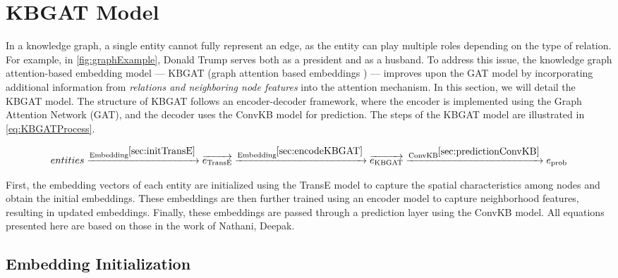 \section{KBGAT Model}

In a knowledge graph, a single entity cannot fully represent an edge, as the entity can play multiple roles depending on the type of relation. For example, in \autoref{fig:graphExample}, Donald Trump serves both as a president and as a husband. To address this issue, the knowledge graph attention-based embedding model — KBGAT (graph attention based embeddings \cite{nathani2019learning}) — improves upon the GAT model by incorporating additional information from \textit{relations and neighboring node features} into the attention mechanism. In this section, we will detail the KBGAT model. The structure of KBGAT follows an encoder-decoder framework, where the encoder is implemented using the Graph Attention Network (GAT), and the decoder uses the ConvKB model for prediction. The steps of the KBGAT model are illustrated in \ref{eq:KBGATProcess}.

\begin{equation}
	\label{eq:KBGATProcess}
	entities \xrightarrow{\text{Embedding}^{\ref{sec:initTransE}}} \overrightarrow{e_{\text{TransE}}} \xrightarrow{\text{Embedding} ^{\ref{sec:encodeKBGAT}}} \overrightarrow{e_{\text{KBGAT}}} \xrightarrow{\text{ConvKB}^{\ref{sec:predictionConvKB}}} e_{\text{prob}}
\end{equation}

First, the embedding vectors of each entity are initialized using the TransE model to capture the spatial characteristics among nodes and obtain the initial embeddings. These embeddings are then further trained using an encoder model to capture neighborhood features, resulting in updated embeddings. Finally, these embeddings are passed through a prediction layer using the ConvKB model. All equations presented here are based on those in the work of Nathani, Deepak\cite{nathani2019learning}.




\subsection{Embedding Initialization}
\label{sec:initTransE}

